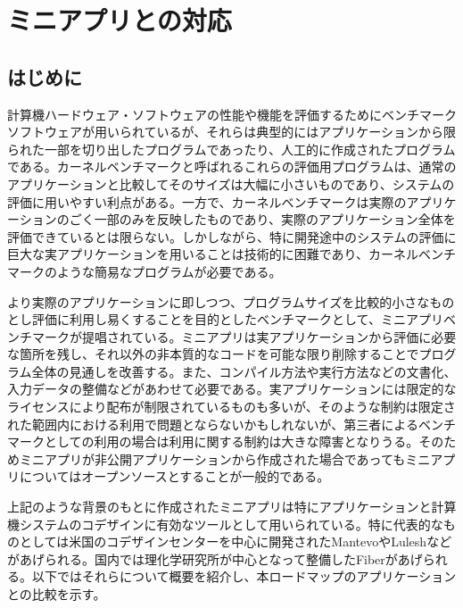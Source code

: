 \section{ミニアプリとの対応}
\label{sec:ミニアプリ}

\subsection{はじめに}

計算機ハードウェア・ソフトウェアの性能や機能を評価するためにベンチマークソフトウェアが用いられているが、それらは典型的にはアプリケーションから限られた一部を切り出したプログラムであったり、人工的に作成されたプログラムである。カーネルベンチマークと呼ばれるこれらの評価用プログラムは、通常のアプリケーションと比較してそのサイズは大幅に小さいものであり、システムの評価に用いやすい利点がある。一方で、カーネルベンチマークは実際のアプリケーションのごく一部のみを反映したものであり、実際のアプリケーション全体を評価できているとは限らない。しかしながら、特に開発途中のシステムの評価に巨大な実アプリケーションを用いることは技術的に困難であり、カーネルベンチマークのような簡易なプログラムが必要である。

より実際のアプリケーションに即しつつ、プログラムサイズを比較的小さなものとし評価に利用し易くすることを目的としたベンチマークとして、ミニアプリベンチマークが提唱されている。ミニアプリは実アプリケーションから評価に必要な箇所を残し、それ以外の非本質的なコードを可能な限り削除することでプログラム全体の見通しを改善する。また、コンパイル方法や実行方法などの文書化、入力データの整備などがあわせて必要である。実アプリケーションには限定的なライセンスにより配布が制限されているものも多いが、そのような制約は限定された範囲内における利用で問題とならないかもしれないが、第三者によるベンチマークとしての利用の場合は利用に関する制約は大きな障害となりうる。そのためミニアプリが非公開アプリケーションから作成された場合であってもミニアプリについてはオープンソースとすることが一般的である。

上記のような背景のもとに作成されたミニアプリは特にアプリケーションと計算機システムのコデザインに有効なツールとして用いられている。特に代表的なものとしては米国のコデザインセンターを中心に開発されたMantevoやLuleshなどがあげられる。国内では理化学研究所が中心となって整備したFiberがあげられる。以下ではそれらについて概要を紹介し、本ロードマップのアプリケーションとの比較を示す。





\nocite{*}



